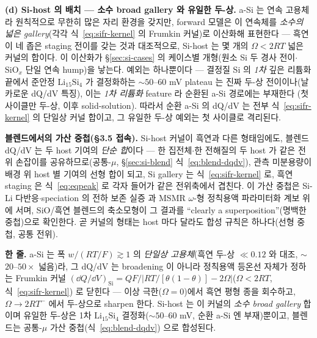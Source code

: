 \textbf{(d) Si-host 의 배치 --- 소수 broad gallery 와 유일한 두-상.} a-Si 는 연속 고용체라 원칙적으로 무한히
많은 자리 환경을 갖지만, forward 모델은 이 연속체를 \emph{소수의 넓은 gallery}(각각 식~\eqref{eq:sifr-kernel} 의
Frumkin 커널)로 이산화해 표현한다 --- 흑연이 네 좁은 staging 전이를 갖는 것과 대조적으로, Si-host 는 몇 개의
$\Omega<2RT$ 넓은 커널의 합이다. 이 이산화가 \S\ref{sec:si-cases} 의 케이스별 개형(원소 Si 두 경사 전이$\cdot$%
SiO$_x$ 단일 연속 hump)을 낳는다. 예외는 하나뿐이다 --- 결정질 Si 의 \emph{1차} 깊은 리튬화 끝에서 준안정
$\mathrm{Li_{15}Si_4}$ 가 결정화하는 $\sim$$50$--$60$ mV plateau 는 진짜 두-상 전이이나(날카로운 dQ/dV
특징\cite{obrovac_christensen2004}), 이는 \emph{1차 리튬화} feature 라 순환된 a-Si 경로에는 부재한다
(첫 사이클만 두-상, 이후 solid-solution\cite{wang_asi2013,mcdowell_coreshell2013,limthongkul2003}). 따라서
순환 a-Si 의 dQ/dV 는 전부 식~\eqref{eq:sifr-kernel} 의 단일상 커널 합이고, 그 유일한 두-상 예외는 첫 사이클로
격리된다.

\textbf{블렌드에서의 가산 중첩(§3.5 접속).} Si-host 커널이 흑연과 다른 형태임에도, 블렌드 dQ/dV 는 두 host
기여의 \emph{단순 합}이다 --- 한 집전체$\cdot$한 전해질의 두 host 가 같은 전위 손잡이를 공유하므로(공통-$\mu$,
\S\ref{sec:si-blend} 식~\eqref{eq:blend-dqdv}), 관측 미분용량이 배경 위 host 별 기여의 선형 합이 되고, Si
gallery 는 식~\eqref{eq:sifr-kernel} 로, 흑연 staging 은 식~\eqref{eq:eqpeak} 로 각자 들어가 같은 전위축에서
겹친다. 이 가산 중첩은 Si-Li 다반응$\cdot$speciation 의 전하 보존 실증\cite{verbrugge_lisi2016} 과 MSMR
$\omega$-형 정칙용액 파라미터화\cite{msmr_origin2017} 계보 위에 서며, SiO/흑연 블렌드의 축소모형이 그 결과를
``clearly a superposition''(명백한 중첩)으로 확인한다\cite{tu_blend2024}. 곧 커널의 형태는 host 마다 달라도
합성 규칙은 하나다(선형 중첩, 공통 전위).
\begin{keybox}
\textbf{한 줄.} a-Si 는 폭 $w/(RT/F)\!\gtrsim\!1$ 의 \emph{단일상 고용체}(흑연 두-상 $\ll0.12$ 와 대조,
$\sim$$20$--$50\times$ 넓음)라, 그 dQ/dV 는 broadening 이 아니라 정칙용액 등온선 자체가 정하는 Frumkin 커널
$(\dd Q/\dd V)_\mathrm{Si}=QF/|RT/[\theta(1-\theta)]-2\Omega|$($\Omega{<}2RT$, 식~\eqref{eq:sifr-kernel})
로 닫힌다 --- 이상 극한($\Omega{=}0$)에서 흑연 평형 종을 회수하고, $\Omega\!\to\!2RT^{-}$ 에서 두-상으로
sharpen 한다. Si-host 는 이 커널의 \emph{소수 broad gallery} 합이며 유일한 두-상은 1차 $\mathrm{Li_{15}Si_4}$
결정화($\sim$$50$--$60$ mV, 순환 a-Si 엔 부재)뿐이고, 블렌드는 공통-$\mu$ 가산 중첩(식~\eqref{eq:blend-dqdv})
으로 합성된다.
\end{keybox}
